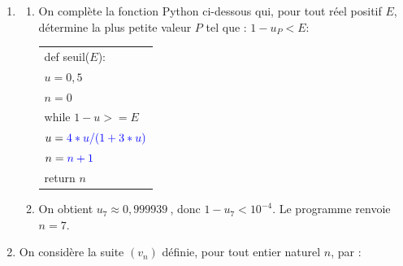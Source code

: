 \documentclass[10pt]{article}
\providecommand{\blue}{\color{blue}}
\providecommand{\R}{\mathbb{R}}
\providecommand{\np}[2][]{{#2~#1}}
\providecommand{\blue}{\color{blue}}
\begin{document}
\begin{enumerate}
\begin{enumerate}
\emph{Conclusion} : l'encadrement est vrai au rang $0$ et s'il est vrai au rang $n \geqslant 0$, \, il est vrai au rang $n + 1$ : par le principe de récurrence pour tout entier naturel $n$, on a : $\dfrac{1}{2} \leqslant u_n \leqslant u_{n+1} \leqslant 2$.
		\item 
		La suite $\left(u_n\right)$ est croissante et elle majorée par 2, elle est donc convergente vers une limite $\ell$ telle que: $\dfrac{1}{2} \leqslant \ell \leqslant 2.$
		\item 
La fonction $f$ est continue car dérivable au moins sur $\R_+$ donc la limite $\ell$ vérifie l'égalité $f(\ell)=\ell$ ; on résout cette équation:

$\begin{gathered}f(\ell) = \ell \iff \dfrac{4\ell}{1 + 3\ell} = \ell 
\iff 4\ell = \ell(1 + 3\ell) 
\iff 0 = \ell(1 + 3\ell - 4) \\
\phantom{f(\ell) = \ell}
\iff \ell(3\ell - 3) = 0 \iff 3\ell(\ell - 1) = 0 \iff 
\left[\begin{array}{l !{=} l}
\ell&0 \\
\multicolumn{2}{c}{\text{ou}}\\
\ell - 1 & 0
\end{array}\right. \iff 
\left[\begin{array}{l !{=} l}
\ell&0\\
\multicolumn{2}{c}{\text{ou}}\\
\ell&1
\end{array}\right. \end{gathered}$	
\end{enumerate}

Comme $\ell \geqslant \dfrac{1}{2}$, la seule solution possible est 1;
la suite $\left(u_n\right)$ converge vers 1.

\item 
	\begin{enumerate}
		\item On  complète la fonction Python ci-dessous qui, pour tout réel positif $E$, détermine la plus petite valeur $P$ tel que : $1 - u_{P} < E$:
		
\begin{center}
\begin{tabularx}{0.4\linewidth}{|X|}\hline
def seuil($E$):\\
\quad $u = 0,5$\\
\quad $n = 0$ \\
\quad  while $1 - u > = E$\\
\quad \quad $u = \blue 4*u/(1 + 3*u)$\\
\quad \quad $n = \blue n + 1$\\
\quad return $n$\\ \hline
\end{tabularx}
\end{center}
		\item 
On obtient $u_7 \approx \np{0,999939}$, donc $1 - u_7 < 10^{-4}$. Le programme renvoie $n = 7$.
	\end{enumerate}
\item On considère la suite $\left(v_n\right)$ définie, pour tout entier naturel $n$, par :


\end{enumerate}
\end{document}
